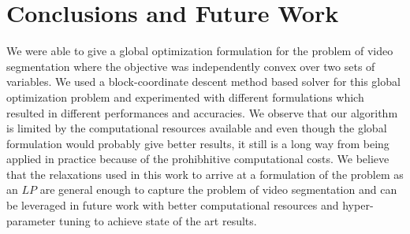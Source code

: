 \section{Conclusions and Future Work}
We were able to give a global optimization formulation for the problem of video segmentation where the objective was independently convex over two sets of variables. We used a block-coordinate descent method based solver for this global optimization problem and experimented with different formulations which resulted in different performances and accuracies. We observe that our algorithm is limited by the computational resources available and even though the global formulation would probably give better results, it still is a long way from being applied in practice because of the prohibhitive computational costs. We believe that the relaxations used in this work to arrive at a formulation of the problem as an $LP$ are general enough to capture the problem of video segmentation and can be leveraged in future work with better computational resources and hyper-parameter tuning to achieve state of the art results.